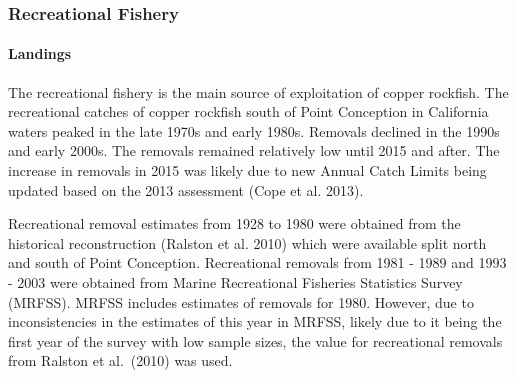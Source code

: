 \documentclass[11pt,
  english,
  a4paper,
]{article}
\begin{document}
\hypertarget{recreational-fishery}{%
\subsubsection{Recreational Fishery}\label{recreational-fishery}}

\leavevmode\tagmcend\tagstructend


\hypertarget{landings-1}{%
\paragraph{Landings}\label{landings-1}}

\leavevmode\tagmcend\tagstructend


The recreational fishery is the main source of exploitation of copper rockfish. The recreational catches of copper rockfish south of Point Conception in California waters peaked in the late 1970s and early 1980s. Removals declined in the 1990s and early 2000s. The removals remained relatively low until 2015 and after. The increase in removals in 2015 was likely due to new Annual Catch Limits being updated based on the 2013 assessment {(Cope et al. 2013)\leavevmode\tagmcend\tagstructend}.

\leavevmode\tagmcend\tagstructend\par


Recreational removal estimates from 1928 to 1980 were obtained from the historical reconstruction {(Ralston et al. 2010)\leavevmode\tagmcend\tagstructend} which were available split north and south of Point Conception. Recreational removals from 1981 - 1989 and 1993 - 2003 were obtained from Marine Recreational Fisheries Statistics Survey (MRFSS). MRFSS includes estimates of removals for 1980. However, due to inconsistencies in the estimates of this year in MRFSS, likely due to it being the first year of the survey with low sample sizes, the value for recreational removals from Ralston et al.~{(2010)\leavevmode\tagmcend\tagstructend} was used.

\leavevmode\tagmcend\tagstructend\par
\end{document}
